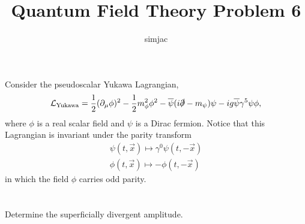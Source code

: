 

\renewcommand{\thesection}{\alph{section})}
\renewcommand{\thesubsection}{\alph{section}.\roman{subsection})}

\newcommand{\mathbar}[1]{\overline{#1}}
\newcommand{\mathtilde}[1]{\widetilde{#1}}
\newcommand{\mathhat}[1]{\widehat{#1}}


\title{{\Huge {}} Quantum Field Theory Problem 6 {\Huge {}}}
\author{simjac}
\date{}



\maketitle

Consider the pseudoscalar Yukawa Lagrangian,
\begin{align}\label{eq:pseduoscalar_yukawa_lagrangian}
    \mathcal{L}_\mathrm{Yukawa} = \frac{1}{2} (\partial_\mu \phi)^2 - \frac{1}{2} m_\phi^2 \phi^2 - \mathbar{\psi} (i \slashed{\partial} - m_\psi) \psi - i g \mathbar{\psi} \gamma^5 \psi \phi,
\end{align}
where $\phi$ is a real scalar field and $\psi$ is a Dirac fermion. Notice that this Lagrangian is invariant under the parity transform \begin{align}
	\psi(t, \Vec{x}) \mapsto \gamma^0 \psi(t, -\Vec{x}) \label{eq:psi_parity_transformation}\\
	\phi(t, \Vec{x}) \mapsto -\phi(t, -\Vec{x}) \label{eq:phi_parity_transformation}
\end{align}
in which the field $\phi$ carries odd parity.

\section{}

\subsection{}
Determine the superficially divergent amplitude.

